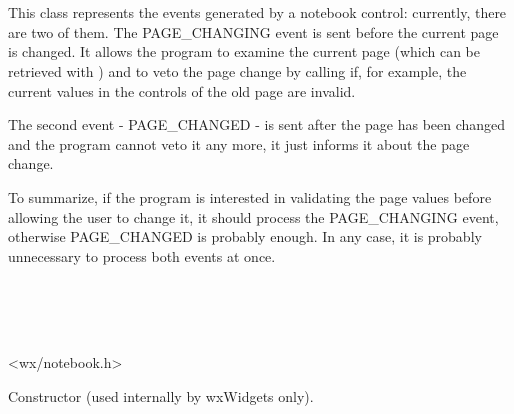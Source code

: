 \section{}\label{wxnotebookevent}

This class represents the events generated by a notebook control: currently,
there are two of them. The PAGE\_CHANGING event is sent before the current
page is changed. It allows the program to examine the current page (which
can be retrieved with 
) and to veto the page
change by calling  if, for example, the
current values in the controls of the old page are invalid.

The second event - PAGE\_CHANGED - is sent after the page has been changed and
the program cannot veto it any more, it just informs it about the page change.

To summarize, if the program is interested in validating the page values
before allowing the user to change it, it should process the PAGE\_CHANGING
event, otherwise PAGE\_CHANGED is probably enough. In any case, it is probably
unnecessary to process both events at once.


\\
\\
\\


<wx/notebook.h>







\label{wxnotebookeventconstr}


Constructor (used internally by wxWidgets only).


\label{wxnotebookeventgetoldselection}


